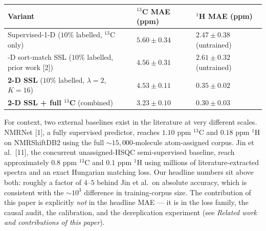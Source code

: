 \documentclass[
  11pt,
  a4paper,
]{article}
\newcounter{none} %
\begin{document}
{\def\LTcaptype{none} %
\begin{longtable}[]{@{}
  >{\raggedright\arraybackslash}p{}
  >{\raggedright\arraybackslash}p{}
  >{\raggedright\arraybackslash}p{}@{}}
\toprule\noalign{}
\begin{minipage}[b]{\linewidth}\raggedright
Variant
\end{minipage} & \begin{minipage}[b]{\linewidth}\raggedright
\(^{13}\)C MAE (ppm)
\end{minipage} & \begin{minipage}[b]{\linewidth}\raggedright
\(^{1}\)H MAE (ppm)
\end{minipage} \\
\midrule\noalign{}
\endhead
\bottomrule\noalign{}
\endlastfoot
Supervised-1-D (\(10\%\) labelled, \(^{13}\)C only) & \(5.60 \pm 0.34\) & \(2.47 \pm 0.38\) (untrained) \\
1-D sort-match SSL (\(10\%\) labelled, prior work {[}2{]}) & \(4.56 \pm 0.31\) & \(2.61 \pm 0.32\) (untrained) \\
\textbf{2-D SSL} (\(10\%\) labelled, \(\lambda=2\), \(K=16\)) & \(\mathbf{4.53 \pm 0.11}\) & \(\mathbf{0.35 \pm 0.02}\) \\
\textbf{2-D SSL + full \(^{13}\)C} (combined) & \(\mathbf{3.23 \pm 0.10}\) & \(\mathbf{0.30 \pm 0.03}\) \\
\end{longtable}
}

For context, two external baselines exist in the literature at very
different scales. NMRNet {[}1{]}, a fully supervised predictor, reaches
\(1.10\) ppm \(^{13}\)C and \(0.18\) ppm \(^{1}\)H on NMRShiftDB2 using the
full \(\sim\!15{,}000\)-molecule atom-assigned corpus. Jin et al.~{[}11{]},
the concurrent unassigned-HSQC semi-supervised baseline, reach
approximately \(0.8\) ppm \(^{13}\)C and \(0.1\) ppm \(^{1}\)H using millions
of literature-extracted spectra and an exact Hungarian matching
loss. Our headline numbers sit above both: roughly a factor of
\(4\)--\(5\) behind Jin et al.~on absolute accuracy, which is consistent
with the \(\sim\!10^{3}\) difference in training-corpus size. The
contribution of this paper is explicitly \emph{not} in the headline MAE
--- it is in the loss family, the causal audit, the calibration, and
the dereplication experiment (see \emph{Related work and contributions
of this paper}).
\end{document}
